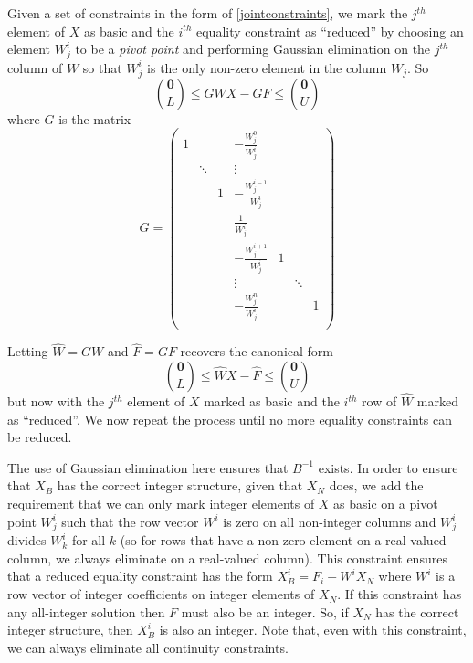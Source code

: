 \documentclass{article}
\begin{document}
Given a set of constraints in the form of \eqref{jointconstraints}, we mark the $j^{th}$ element of $X$ as basic and the $i^{th}$ equality constraint as ``reduced'' by choosing an element $W^i_j$ to be a \textit{pivot point} and performing Gaussian elimination on the $j^{th}$ column of $W$ so that $W^i_j$ is the only non-zero element in the column $W_j$. So
\[
{\mathbf{0} \choose L} \le GWX - GF \le {\mathbf{0} \choose U}
\]
where $G$ is the matrix
\[
G =  
\begin{pmatrix}
1 &  & &-\frac{W^0_j}{W^i_j} & & &\\
& \ddots & &\vdots & & &\\
& & 1 & -\frac{W^{i-1}_j}{W^i_j} & & &\\
& & & \frac{1}{W^i_j} & & &\\
& &  & -\frac{W^{i+1}_j}{W^i_j} & 1 & &\\
& & & \vdots & & \ddots &\\
& & & -\frac{W^n_j}{W^i_j} & & &1\\
\end{pmatrix}
\]

Letting $\hat{W} = GW$ and $\hat{F} = GF$ recovers the canonical form
\begin{equation}
{\mathbf{0} \choose L} \le \hat{W}X - \hat{F} \le {\mathbf{0} \choose U}
\label{eliminatedConstraint}
\end{equation}
but now with the $j^{th}$ element of $X$ marked as basic and the $i^{th}$ row of $\hat{W}$ marked as ``reduced''. We now repeat the process until no more equality constraints can be reduced.

The use of Gaussian elimination here ensures that $B^{-1}$ exists. In order to ensure that $X_B$ has the correct integer structure, given that $X_N$ does, we add the requirement that we can only mark integer elements of $X$ as basic on a pivot point $W^i_j$ such that the row vector $W^i$ is zero on all non-integer columns and $W^i_j$ divides $W^i_k$ for all $k$ (so for rows that have a non-zero element on a real-valued column, we always eliminate on a real-valued column). This constraint ensures that a reduced equality constraint has the form $X_B^i = F_i - W^iX_N$ where $W^i$ is a row vector of integer coefficients on integer elements of $X_N$. If this constraint has any all-integer solution then $F$ must also be an integer. So, if $X_N$ has the correct integer structure, then $X_B^i$ is also an integer. Note that, even with this constraint, we can always eliminate all continuity constraints.
\end{document}
